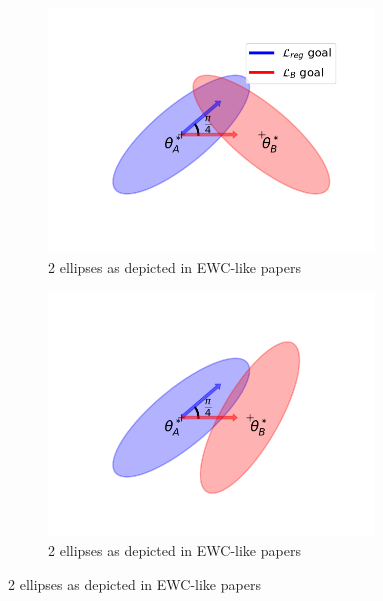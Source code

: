 \documentclass[11pt]{article}
\begin{document}
\begin{figure}
    \centering
    \begin{subfigure}[b]{0.25\textwidth}
        \centering
        \includegraphics[width=0.95\textwidth]{images/ellipse_overlap_45.png}
        \caption{2 ellipses as depicted in EWC-like papers}
        \label{fig:two_ellipses_45_hard}
    \end{subfigure}
    \hspace{-8mm}
    \begin{subfigure}[b]{0.25\textwidth}
        \centering
        \includegraphics[width=0.95\textwidth]{images/ellipse_overlap_45_hard.png}
        \caption{2 ellipses as depicted in EWC-like papers}
        \label{fig:two_ellipses_45}
    \end{subfigure}
    \hspace{-8mm}

\end{figure}
\end{document}
